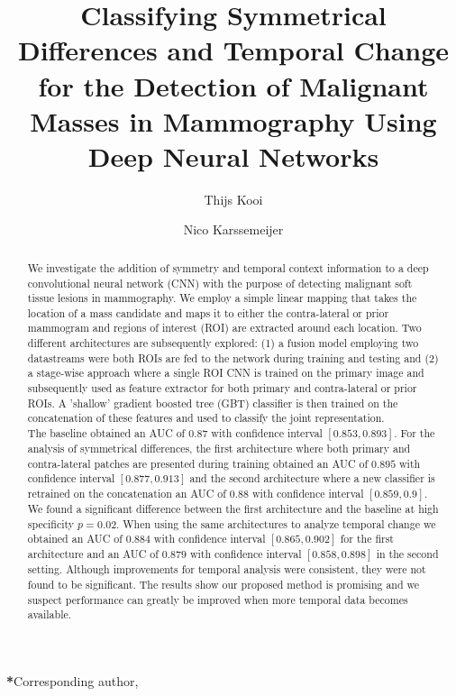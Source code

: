 \documentclass[12pt]{spieman}  %
\title{Classifying Symmetrical Differences and Temporal Change for the Detection of Malignant Masses in Mammography Using Deep Neural Networks}
\author[a, *]{Thijs Kooi}
\author[a]{Nico Karssemeijer}
\affil[a]{Diagnostic Image Analysis Group, Department of Radiology and Nuclear Medicine, RadboudUMC Nijmegen, The Netherlands}
\begin{document}
 
\maketitle


\begin{abstract}
  We investigate the addition of symmetry and temporal context information to a deep convolutional neural network (CNN) with the purpose of detecting malignant soft tissue lesions in mammography. We employ a simple linear mapping that takes the location of a mass candidate and maps it to either the contra-lateral or prior mammogram and regions of interest (ROI) are extracted around each location. Two different architectures are subsequently explored: (1) a fusion model employing two datastreams were both ROIs are fed to the network during training and testing and (2) a stage-wise approach where a single ROI CNN is trained on the primary image and subsequently used as feature extractor for both primary and contra-lateral or prior ROIs. A 'shallow' gradient boosted tree (GBT) classifier is then trained on the concatenation of these features and used to classify the joint representation. \\
  
  The baseline obtained an AUC of $0.87$ with confidence interval $[0.853, 0.893]$. For the analysis of symmetrical differences, the first architecture where both primary and contra-lateral patches are presented during training obtained an AUC of $0.895$ with confidence interval $[0.877, 0.913]$ and the second architecture where a new classifier is retrained on the concatenation an AUC of $0.88$ with confidence interval $[0.859, 0.9]$. We found a significant difference between the first architecture and the baseline at high specificity $p = 0.02$. When using the same architectures to analyze temporal change we obtained an AUC of $0.884$ with confidence interval $[0.865, 0.902]$ for the first architecture and an AUC of $0.879$ with confidence interval $[0.858, 0.898]$ in the second setting. Although improvements for temporal analysis were consistent, they were not found to be significant. The results show our proposed method is promising and we suspect performance can greatly be improved when more temporal data becomes available.
\end{abstract}


{\noindent \footnotesize\textbf{*}Corresponding author,   }
\end{document}
